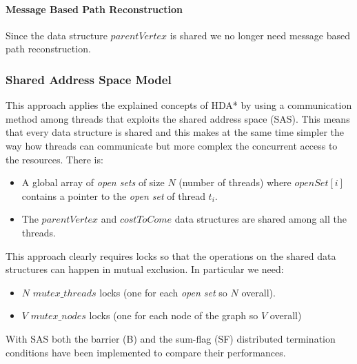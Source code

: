 \documentclass[twocolumn, switch]{article} %
\begin{document}
\paragraph{Message Based Path Reconstruction}
Since the data structure $parentVertex$ is shared we no longer need message based path reconstruction.
\subsubsection{Shared Address Space Model}
This approach applies the explained concepts of HDA* by using a communication method
among threads that exploits the shared address space (SAS). This means that every data structure
is shared and this makes at the same time simpler the way how threads can communicate but more complex
the concurrent access to the resources. There is:
\begin{itemize}
  \item A global array of \textit{open sets} of size $N$ (number of threads)
      where $openSet[i]$ contains a pointer to the \textit{open set} of thread $t_i$.
  \item The $parentVertex$ and $costToCome$ data structures are shared among all the threads.
\end{itemize}
This approach clearly requires locks so that the operations on the shared data structures
can happen in mutual exclusion. In particular we need:
\begin{itemize}
  \item $N$ $mutex\_threads$ locks (one for each \textit{open set} so $N$ overall).
  \item $V$ $mutex\_nodes$ locks (one for each node of the graph so $V$ overall)
\end{itemize}
With SAS both the barrier (B) and the sum-flag (SF) distributed termination conditions
have been implemented to compare their performances.
\end{document}
